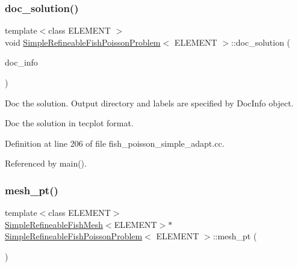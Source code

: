\mbox{\label{classSimpleRefineableFishPoissonProblem_a59e92fc454dea540b48a1a12751efc5b}} 
\subsubsection{\texorpdfstring{doc\+\_\+solution()}{doc\_solution()}}
{\footnotesize\ttfamily template$<$class E\+L\+E\+M\+E\+NT $>$ \\
void \hyperlink{classSimpleRefineableFishPoissonProblem}{Simple\+Refineable\+Fish\+Poisson\+Problem}$<$ E\+L\+E\+M\+E\+NT $>$\+::doc\+\_\+solution (\begin{DoxyParamCaption}\item[{Doc\+Info \&}]{doc\+\_\+info }\end{DoxyParamCaption})}



Doc the solution. Output directory and labels are specified by Doc\+Info object. 

Doc the solution in tecplot format. 

Definition at line 206 of file fish\+\_\+poisson\+\_\+simple\+\_\+adapt.\+cc.



Referenced by main().

\mbox{\label{classSimpleRefineableFishPoissonProblem_af7b30bf0ed7fed95b40bbdca9ce295a0}} 
\subsubsection{\texorpdfstring{mesh\+\_\+pt()}{mesh\_pt()}}
{\footnotesize\ttfamily template$<$class E\+L\+E\+M\+E\+NT$>$ \\
\hyperlink{classSimpleRefineableFishMesh}{Simple\+Refineable\+Fish\+Mesh}$<$E\+L\+E\+M\+E\+NT$>$$\ast$ \hyperlink{classSimpleRefineableFishPoissonProblem}{Simple\+Refineable\+Fish\+Poisson\+Problem}$<$ E\+L\+E\+M\+E\+NT $>$\+::mesh\+\_\+pt (\begin{DoxyParamCaption}{ }\end{DoxyParamCaption})\hspace{0.3cm}{\ttfamily [inline]}}



